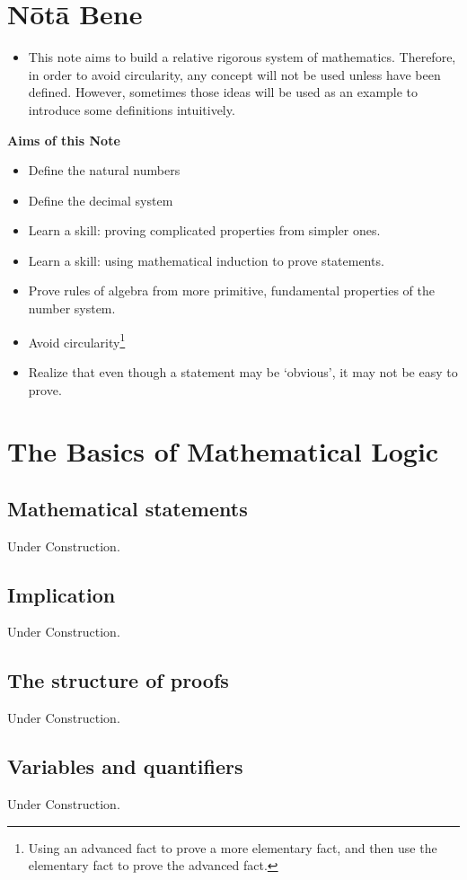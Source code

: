 \documentclass[a4paper,oneside]{book}
\begin{document}
	\chapter{N\={o}t\={a} Bene}
		\begin{itemize}
			\item This note aims to build a relative rigorous system of mathematics. Therefore, in order to avoid circularity, any concept will not be used unless have been defined. However, sometimes those ideas will be used as an example to introduce some definitions intuitively.
		\end{itemize}
				\textbf{Aims of this Note}
		\begin{itemize}
			\item Define the natural numbers
			\item Define the decimal system
			\item Learn a skill: proving complicated properties from simpler ones.
			\item Learn a skill: using mathematical induction to prove statements.
			\item Prove rules of algebra from more primitive, fundamental properties of the number system.
			\item Avoid circularity\footnote{Using an advanced fact to prove a more elementary fact, and then use the elementary fact to prove the advanced fact.}
			\item Realize that even though a statement may be `obvious', it may not be easy to prove.
		\end{itemize}
	\chapter{The Basics of Mathematical Logic}
		\section{Mathematical statements}
			Under Construction.
		\section{Implication}
			Under Construction.
		\section{The structure of proofs}
			Under Construction.
		\section{Variables and quantifiers}
			Under Construction.
\end{document}
